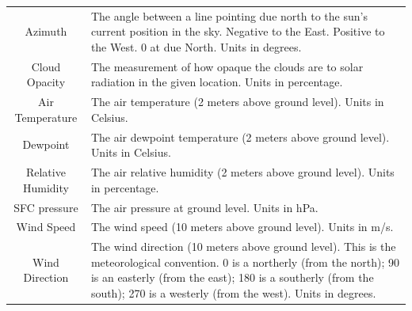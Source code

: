 \begin{table}[hbt!]
\begin{adjustwidth*}{-3.0cm}{-3.0cm}
\begin{tabularx}{\linewidth}{cX}
                        \\
                        Azimuth                                  & The angle between a line pointing due north to the sun's current position in the sky. Negative to the East. Positive to the West. 0 at due North. Units in degrees.
                        \\
                        Cloud Opacity                            & The measurement of how opaque the clouds are to solar radiation in the given location. Units in percentage.                                                                                                                                               \\
                        Air Temperature                          & The air temperature (2 meters above ground level). Units in Celsius.                                                                                                                                                                                      \\
                        Dewpoint                                 & The air dewpoint temperature (2 meters above ground level). Units in Celsius.                                                                                                                                                                             \\
                        Relative Humidity                        & The air relative humidity (2 meters above ground level). Units in percentage.                                                                                                                                                                             \\
                        SFC pressure                             & The air pressure at ground level. Units in hPa.                                                                                                                                                                                                           \\
                        Wind Speed                               & The wind speed (10 meters above ground level). Units in m/s.                                                                                                                                                                                              \\
                        Wind Direction                           & The wind direction (10 meters above ground level). This is the meteorological convention. 0 is a northerly (from the north); 90 is an easterly (from the east); 180 is a southerly (from the south); 270 is a westerly (from the west). Units in degrees. \\

\end{tabularx}
\end{adjustwidth*}
\end{table}
